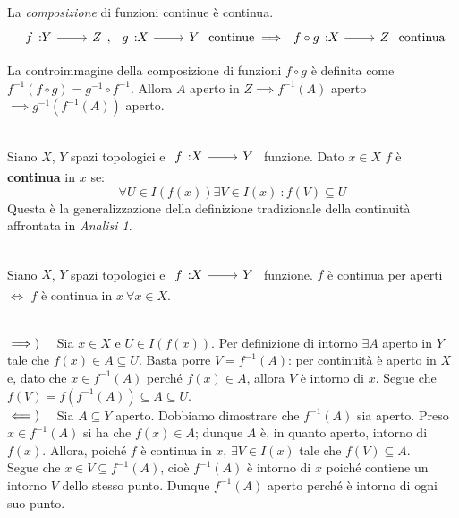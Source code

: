 \begin{theorema}~{}\label{compfunzcont}\\
La \textit{composizione} di funzioni continue è continua.
\begin{equation}
\funz{f}{Y}{Z},\ \funz{g}{X}{Y}\text{ continue}\implies \funz{f\circ g}{X}{Z}\text{ continua}
\end{equation}
\vspace{-6mm}
\end{theorema}
\begin{demonstration}
La controimmagine della composizione di funzioni $f\circ g$ è definita come $f^{-1}\left(f\circ g\right)=g^{-1}\circ f^{-1}$. Allora $A$ aperto in $Z\implies f^{-1}\left(A\right)$ aperto $\implies g^{-1}\left(f^{-1}\left(A\right)\right)$ aperto.
\end{demonstration}
\begin{define}~{}\\
Siano $X$, $Y$ spazi topologici e $\funz{f}{X}{Y}$ funzione. Dato $x\in X$ $f$ è \textbf{continua} in $x$ se:
\begin{equation}
	\forall U\in I\left(f\left(x\right)\right)\exists V\in I\left(x\right)\ \colon f\left(V\right)\subseteq U
\end{equation}
Questa è la generalizzazione della definizione tradizionale della continuità affrontata in \textit{Analisi 1}.
\end{define}
\begin{theorema}~{}\\
Siano $X$, $Y$ spazi topologici e $\funz{f}{X}{Y}$ funzione. $f$ è continua per aperti $\iff$ $f$ è continua in $x\ \forall x\in X$.
\end{theorema}
\begin{demonstration}~{}\\
$\implies)\quad$ Sia $x\in X$ e $U\in I\left(f\left(x\right)\right)$. Per definizione di intorno $\exists A$ aperto in $Y$ tale che $f\left(x\right)\in A\subseteq U$.
Basta porre $V=f^{-1}\left(A\right)$: per continuità è aperto in $X$ e, dato che $x\in f^{-1}\left(A\right)$ perché $f\left(x\right)\in A$, allora $V$ è intorno di $x$. Segue che $f\left(V\right)=f\left(f^{-1}\left(A\right)\right)\subseteq A\subseteq U$.\\
$\impliedby)\quad$ Sia $A\subseteq Y$ aperto. Dobbiamo dimostrare che $f^{-1}\left(A\right)$ sia aperto. Preso $x\in f^{-1}\left(A\right)$ si ha che $f\left(x\right)\in A$; dunque $A$ è, in quanto aperto, intorno di $f\left(x\right)$. Allora, poiché $f$ è continua in $x$, $\exists V\in I\left(x\right)$ tale che $f\left(V\right)\subseteq A$.\\
Segue che $x\in V\subseteq f^{-1}\left(A\right)$, cioè $f^{-1}\left(A\right)$ è intorno di $x$ poiché contiene un intorno $V$ dello stesso punto. Dunque $f^{-1}\left(A\right)$ aperto perché è intorno di ogni suo punto.
\end{demonstration}
